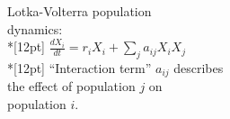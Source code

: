 \documentclass{article}
\begin{document}
\noindent
Lotka-Volterra population\\
dynamics:
\\*[12pt]
\indent
\( \frac{dX_i}{dt} = r_i X_i + \sum_j a_{ij} X_i X_j
\)
\\*[12pt]
\noindent
``Interaction term'' $a_{ij}$ describes\\
the effect of population $j$ on\\
population $i$.
\end{document}
